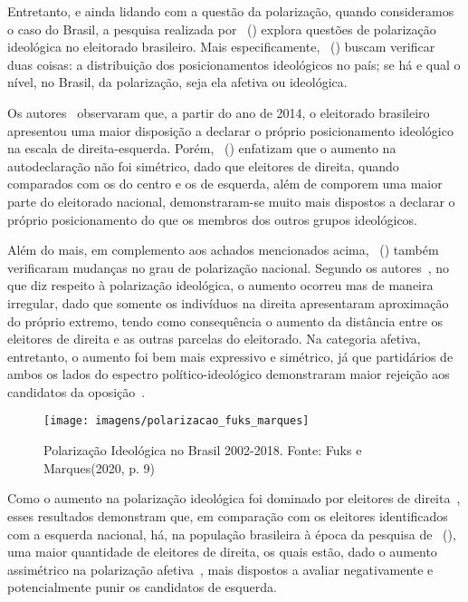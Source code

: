 \documentclass[
	12pt,				%
	openright,			%
	twoside,			%
	a4paper,			%
	openany,
	english,			%
	brazil				%
	]{abntex2}
\begin{document}
Entretanto, e ainda lidando com a questão da polarização, quando consideramos o caso do Brasil, a pesquisa realizada por ~(\citeyear{fuks2020afeto}) explora questões de polarização ideológica no eleitorado brasileiro. Mais especificamente, ~(\citeyear{fuks2020afeto}) buscam verificar duas coisas: a distribuição dos posicionamentos ideológicos no país; se há e qual o nível, no Brasil, da polarização, seja ela afetiva ou ideológica.

Os autores~\cite{fuks2020afeto} observaram que, a partir do ano de 2014, o eleitorado brasileiro apresentou uma maior disposição a declarar o próprio posicionamento ideológico na escala de direita-esquerda. Porém, ~(\citeyear{fuks2020afeto}) enfatizam que o aumento na autodeclaração não foi simétrico, dado que eleitores de direita, quando comparados com os do centro e os de esquerda, além de comporem uma maior parte do eleitorado nacional, demonstraram-se muito mais dispostos a declarar o próprio posicionamento do que os membros dos outros grupos ideológicos. 

Além do mais, em complemento aos achados mencionados acima, ~(\citeyear{fuks2020afeto}) também verificaram mudanças no grau de polarização nacional. Segundo os autores~\cite{fuks2020afeto}, no que diz respeito à polarização ideológica, o aumento ocorreu mas de maneira irregular, dado que somente os indivíduos na direita apresentaram aproximação do próprio extremo, tendo como consequência o aumento da distância entre os eleitores de direita e as outras parcelas do eleitorado. Na categoria afetiva, entretanto, o aumento foi bem mais expressivo e simétrico, já que partidários de ambos os lados do espectro político-ideológico demonstraram maior rejeição aos candidatos da oposição~\cite{fuks2020afeto}.\\ %

\begin{figure}[htp!]
	\centering
	\texttt{[image: imagens/polarizacao\_fuks\_marques]}\hspace{\fill}
	\caption{Polarização Ideológica no Brasil 2002-2018. Fonte: Fuks e Marques(2020, p. 9)}
	\label{fig:polarizacaofuksmarques}
\end{figure}

Como o aumento na polarização ideológica foi dominado por eleitores de direita~\cite{fuks2020afeto}, esses resultados demonstram que, em comparação com os eleitores identificados com a esquerda nacional, há, na população brasileira à época da pesquisa de ~(\citeyear{fuks2020afeto}), uma maior quantidade de eleitores de direita, os quais estão, dado o aumento assimétrico na polarização afetiva~\cite{fuks2020afeto}, mais dispostos a avaliar negativamente e potencialmente punir os candidatos de esquerda.
\end{document}
